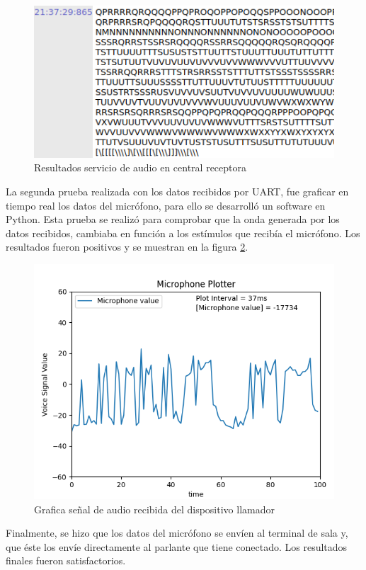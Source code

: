 \begin{figure}[htpb]
	\centering
	\includegraphics[scale=0.5]{./Figures/acsCR.png}	
	\caption{Resultados servicio de audio en central receptora}
	\label{fig:Pacs2}
\end{figure}

La segunda prueba realizada con los datos recibidos por UART, fue graficar en tiempo real los datos del micrófono, para ello se desarrolló un software en Python. Esta prueba se realizó para comprobar que la onda generada por los datos recibidos, cambiaba en función a los estímulos que recibía el micrófono. Los resultados fueron positivos y se muestran en la figura \ref{fig:Psau}.

\begin{figure}[htpb]
	\centering
	\includegraphics[scale=0.6]{./Figures/callpython.png}	
	\caption{Grafica señal de audio recibida del dispositivo llamador}
	\label{fig:Psau}
\end{figure}

Finalmente, se hizo que los datos del micrófono se envíen al terminal de sala y, que éste los envíe directamente al parlante que tiene conectado. Los resultados finales fueron satisfactorios.

